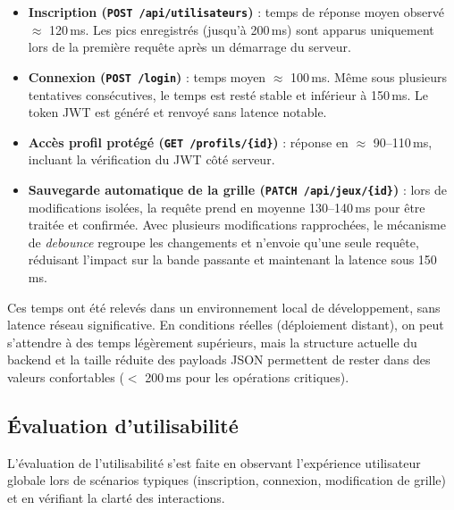 \documentclass[12pt]{article}        %
\begin{document}
\begin{itemize}
  \item \textbf{Inscription (\texttt{POST /api/utilisateurs})} : temps de réponse moyen observé $\approx$ 120\,ms. Les pics enregistrés (jusqu’à 200\,ms) sont apparus uniquement lors de la première requête après un démarrage du serveur.
  
  \item \textbf{Connexion (\texttt{POST /login})} : temps moyen $\approx$ 100\,ms. Même sous plusieurs tentatives consécutives, le temps est resté stable et inférieur à 150\,ms. Le token JWT est généré et renvoyé sans latence notable.
  
  \item \textbf{Accès profil protégé (\texttt{GET /profils/\{id\}})} : réponse en $\approx$ 90–110\,ms, incluant la vérification du JWT côté serveur.
  
  \item \textbf{Sauvegarde automatique de la grille (\texttt{PATCH /api/jeux/\{id\}})} : lors de modifications isolées, la requête prend en moyenne 130–140\,ms pour être traitée et confirmée. Avec plusieurs modifications rapprochées, 
  le mécanisme de \emph{debounce} regroupe les changements et n’envoie qu’une seule requête, réduisant l’impact sur la bande passante et maintenant la latence sous 150\,ms.
\end{itemize}

\noindent Ces temps ont été relevés dans un environnement local de développement, sans latence réseau significative.  
En conditions réelles (déploiement distant), on peut s’attendre à des temps légèrement supérieurs, mais la structure actuelle du backend et la taille réduite des payloads JSON permettent de rester dans des valeurs confortables ($<$ 200\,ms pour les opérations critiques).


\subsection{Évaluation d'utilisabilité}
\label{subsec: utilisabilité}

L’évaluation de l’utilisabilité s’est faite en observant l’expérience utilisateur globale lors de scénarios typiques (inscription, connexion, modification de grille) et en vérifiant la clarté des interactions.
\end{document}
